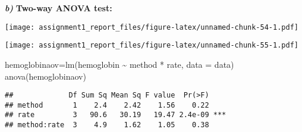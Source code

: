\documentclass[
]{article}
\newenvironment{Shaded}{\begin{snugshade}}{\end{snugshade}}
\newcommand{\AttributeTok}[1]{\textcolor[rgb]{0.77,0.63,0.00}{#1}}
\newcommand{\CommentTok}[1]{\textcolor[rgb]{0.56,0.35,0.01}{\textit{#1}}}
\newcommand{\FunctionTok}[1]{\textcolor[rgb]{0.00,0.00,0.00}{#1}}
\newcommand{\NormalTok}[1]{#1}
\newcommand{\OtherTok}[1]{\textcolor[rgb]{0.56,0.35,0.01}{#1}}
\newcommand{\SpecialCharTok}[1]{\textcolor[rgb]{0.00,0.00,0.00}{#1}}
\begin{document}
\textbf{\emph{b)}} \textbf{Two-way ANOVA test:}

\begin{Shaded}
\end{Shaded}

\texttt{[image: assignment1\_report\_files/figure-latex/unnamed-chunk-54-1.pdf]}

\begin{Shaded}
\end{Shaded}

\texttt{[image: assignment1\_report\_files/figure-latex/unnamed-chunk-55-1.pdf]}

\begin{Shaded}
\begin{Highlighting}[]
\NormalTok{hemoglobinaov}\OtherTok{=}\FunctionTok{lm}\NormalTok{(hemoglobin }\SpecialCharTok{\textasciitilde{}}\NormalTok{ method }\SpecialCharTok{*}\NormalTok{ rate, }\AttributeTok{data =}\NormalTok{ data) }
\FunctionTok{anova}\NormalTok{(hemoglobinaov)}
\end{Highlighting}
\end{Shaded}

\begin{verbatim}
##             Df Sum Sq Mean Sq F value  Pr(>F)    
## method       1    2.4    2.42    1.56    0.22    
## rate         3   90.6   30.19   19.47 2.4e-09 ***
## method:rate  3    4.9    1.62    1.05    0.38    
\end{verbatim}
\end{document}
